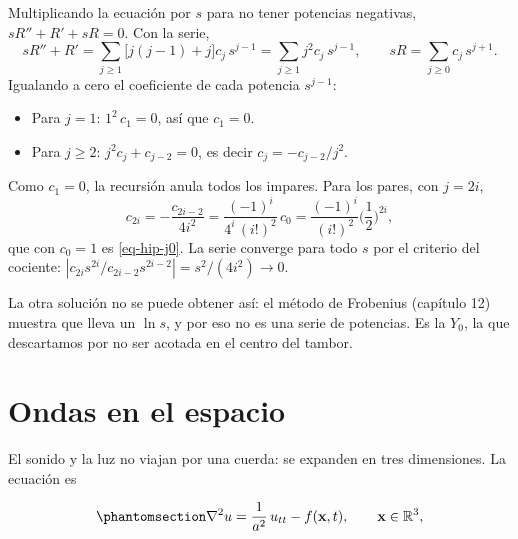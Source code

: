 \documentclass[
  spanish,
  a4paper,
]{scrbook}
\providecommand{\tightlist}{%
  \setlength{\itemsep}{0pt}\setlength{\parskip}{0pt}}
\theoremstyle{definition}
\theoremstyle{plain}
\theoremstyle{definition}
\theoremstyle{plain}
\theoremstyle{definition}
\theoremstyle{remark}
\begin{document}
\begin{tcolorbox}[enhanced jigsaw, arc=.35mm, bottomrule=.15mm, bottomtitle=1mm, breakable, colback=white, colbacktitle=quarto-callout-tip-color!10!white, colframe=quarto-callout-tip-color-frame, coltitle=black, left=2mm, leftrule=.75mm, opacityback=0, opacitybacktitle=0.6, rightrule=.15mm, title=\textcolor{quarto-callout-tip-color}{\faLightbulb}\hspace{0.5em}{Solución}, titlerule=0mm, toprule=.15mm, toptitle=1mm]

Multiplicando la ecuación por \(s\) para no tener potencias negativas,
\(sR'' + R' + sR = 0\). Con la serie, \[
sR'' + R' = \sum_{j\ge1}\big[j(j-1) + j\big]c_j\,s^{j-1} = \sum_{j\ge1}j^2c_j\,s^{j-1},
\qquad sR = \sum_{j\ge0}c_j\,s^{j+1}.
\] Igualando a cero el coeficiente de cada potencia \(s^{j-1}\):

\begin{itemize}
\tightlist
\item
  Para \(j = 1\): \(1^2\,c_1 = 0\), así que \(c_1 = 0\).
\item
  Para \(j\ge2\): \(j^2c_j + c_{j-2} = 0\), es decir
  \(c_j = -c_{j-2}/j^2\).
\end{itemize}

Como \(c_1 = 0\), la recursión anula todos los impares. Para los pares,
con \(j = 2i\), \[
c_{2i} = -\frac{c_{2i-2}}{4i^2} = \frac{(-1)^i}{4^i\,(i!)^2}\,c_0 = \frac{(-1)^i}{(i!)^2}\Big(\frac12\Big)^{2i},
\] que con \(c_0 = 1\) es \ref{eq-hip-j0}. La serie converge para todo
\(s\) por el criterio del cociente:
\(|c_{2i}s^{2i}/c_{2i-2}s^{2i-2}| = s^2/(4i^2)\to0\).

La otra solución no se puede obtener así: el método de Frobenius
(capítulo 12) muestra que lleva un \(\ln s\), y por eso no es una serie
de potencias. Es la \(Y_0\), la que descartamos por no ser acotada en el
centro del tambor.

\end{tcolorbox}

\section{Ondas en el espacio}\label{sec-hip-espacio}

El sonido y la luz no viajan por una cuerda: se expanden en tres
dimensiones. La ecuación es

\begin{equation}\protect\phantomsection\label{eq-hip-onda-3d}{
\nabla^2u = \frac{1}{a^2}\,u_{tt} - f(\mathbf x,t), \qquad \mathbf x\in\mathbb R^3,
}\end{equation}
\end{document}
